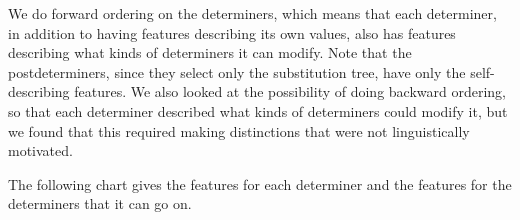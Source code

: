 
We do forward ordering on the determiners, which means that each determiner, in
addition to having features describing its own values, also has features
describing what kinds of determiners it can modify.  Note that the
postdeterminers, since they select only the substitution tree, have only the
self-describing features.  We also looked at the possibility of doing
backward ordering, so that each determiner described what kinds of determiners
could modify it, but we found that this required making distinctions that were
not linguistically motivated.

The following chart gives the features for each determiner and the features for
the determiners that it can go on.

\vspace*{0.3in}

